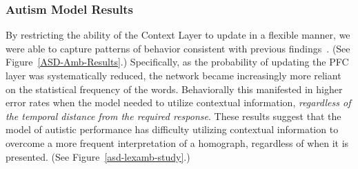 \subsubsection{Autism Model Results}
By restricting the ability of the Context Layer to update in a flexible manner, we were able to capture patterns of behavior consistent with previous findings~\cite{HappeF:1997:WCC_Homographs}. (See Figure~\ref{ASD-Amb-Results}.) Specifically, as the probability of updating the PFC layer was systematically reduced, the network became increasingly more reliant on the statistical frequency of the words.  Behaviorally this manifested in higher error rates when the model needed to utilize contextual information, \emph{regardless of the temporal distance from the required response}.  These results suggest that the model of autistic performance has difficulty utilizing contextual information to overcome a more frequent interpretation of a homograph, regardless of when it is presented.  (See Figure~\ref{asd-lexamb-study}.) 

